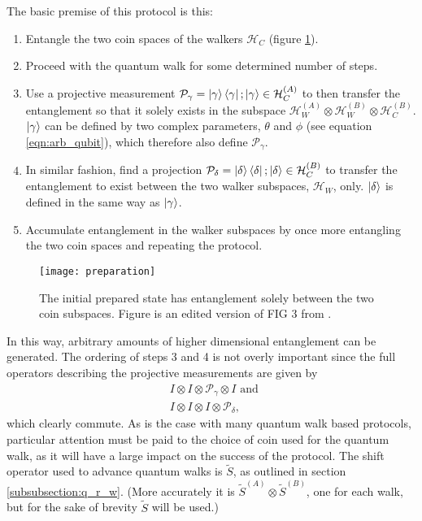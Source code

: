 The basic premise of this protocol is this:
\begin{enumerate}
    \item Entangle the two coin spaces of the walkers $\mathcal{H}_C$ (figure \ref{fig:preparation}).
    \item Proceed with the quantum walk for some determined number of steps.
    \item Use a projective measurement $\mathcal{P}_\gamma = \ket{\gamma}\bra{\gamma}; \ket{\gamma}\in\mathcal{H}^{(A)}_C$ to then transfer the entanglement so that it solely exists in the subspace $\mathcal{H}^{(A)}_W \otimes \mathcal{H}^{(B)}_W \otimes \mathcal{H}^{(B)}_C$. $\ket{\gamma}$ can be defined by two complex parameters, $\theta$ and $\phi$ (see equation \ref{eqn:arb_qubit}), which therefore also define $\mathcal{P}_\gamma$.
    \item In similar fashion, find a projection $\mathcal{P}_\delta = \ket{\delta}\bra{\delta}; \ket{\delta}\in\mathcal{H}^{(B)}_C$ to transfer the entanglement to exist between the two walker subspaces, $\mathcal{H}_W$, only. $\ket{\delta}$ is defined in the same way as $\ket{\gamma}$.
    \item Accumulate entanglement in the walker subspaces by once more entangling the two coin spaces and repeating the protocol.
\end{enumerate}

\begin{figure}
    \centering
    \texttt{[image: preparation]}
    \caption{The initial prepared state has entanglement solely between the two coin subspaces. Figure is an edited version of FIG 3 from \cite{giordani2020}.}
    \label{fig:preparation}
\end{figure}
In this way, arbitrary amounts of higher dimensional entanglement can be generated.\newline
The ordering of steps 3 and 4 is not overly important since the full operators describing the projective measurements are given by
\begin{align}
    & I \otimes I \otimes \mathcal{P}_\gamma \otimes I \text{ and }\\
    &I \otimes I \otimes I \otimes \mathcal{P}_\delta,
\end{align}
which clearly commute.
As is the case with many quantum walk based protocols, particular attention must be paid to the choice of coin used for the quantum walk, as it will have a large impact on the success of the protocol.
The shift operator used to advance quantum walks is $\tilde{S}$, as outlined in section \ref{subsubsection:q_r_w}.
(More accurately it is $\tilde{S}^{(A)}\otimes\tilde{S}^{(B)}$, one for each walk, but for the sake of brevity $\tilde{S}$ will be used.)

